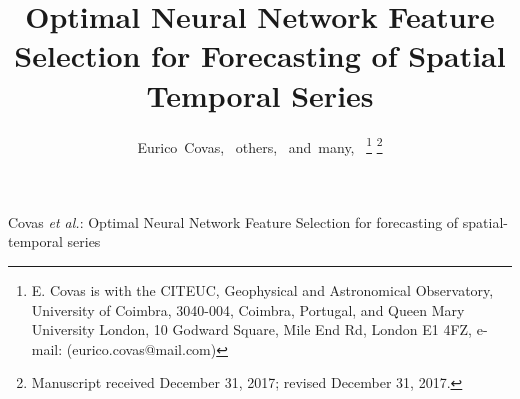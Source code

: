 \documentclass[journal]{IEEEtran}
\begin{document}
%
\title{Optimal Neural Network Feature Selection for Forecasting of Spatial Temporal Series}
%
%
%

\author{Eurico~Covas,~\IEEEmembership{}
        others,~\IEEEmembership{}
        and~many,~\IEEEmembership{}%
\thanks{E. Covas is with the CITEUC, Geophysical and Astronomical Observatory, University of Coimbra, 3040-004, Coimbra, Portugal, and 
Queen Mary University London, 10 Godward Square, Mile End Rd, London E1 4FZ,  e-mail: (eurico.covas@mail.com)}%
\thanks{Manuscript received December 31, 2017; revised December 31, 2017.}}

% 
%



\markboth{}%
{Covas \MakeLowercase{\textit{et al.}}: Optimal Neural Network Feature Selection for forecasting of spatial-temporal series}
% 
\end{document}
